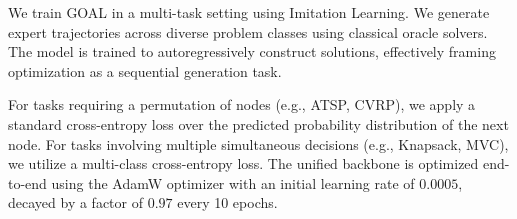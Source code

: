 \noindent We train GOAL in a multi-task setting using Imitation Learning. We generate expert trajectories across diverse problem classes using classical oracle solvers. The model is trained to autoregressively construct solutions, effectively framing optimization as a sequential generation task. 

\vspace{0.5em}
\noindent For tasks requiring a permutation of nodes (e.g., ATSP, CVRP), we apply a standard cross-entropy loss over the predicted probability distribution of the next node. For tasks involving multiple simultaneous decisions (e.g., Knapsack, MVC), we utilize a multi-class cross-entropy loss. The unified backbone is optimized end-to-end using the AdamW optimizer with an initial learning rate of $0.0005$, decayed by a factor of $0.97$ every 10 epochs.